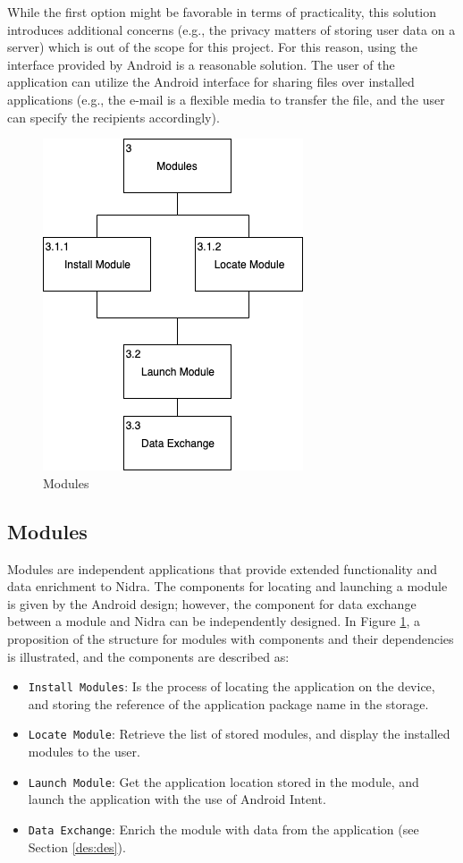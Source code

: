 While the first option might be favorable in terms of practicality, this solution introduces additional concerns (e.g., the privacy matters of storing user data on a server) which is out of the scope for this project. For this reason, using the interface provided by Android is a reasonable solution. The user of the application can utilize the Android interface for sharing files over installed applications (e.g., the e-mail is a flexible media to transfer the file, and the user can specify the recipients accordingly).  


\begin{figure}[!h]
    \centering
    \includegraphics[scale=0.6]{images/Modules.png}
    \caption{Modules}
    \label{fig:hta_modules}
\end{figure}

\subsection{Modules}\label{soc:modules}

Modules are independent applications that provide extended functionality and data enrichment to Nidra. The components for locating and launching a module is given by the Android design; however, the component for data exchange between a module and Nidra can be independently designed.  In Figure \ref{fig:hta_modules}, a proposition of the structure for modules with components and their dependencies is illustrated, and the components are described as:

\begin{itemize}
    \item[3.1.1] \verb|Install Modules|: Is the process of locating the application on the device, and storing the reference of the application package name in the storage.  
    \item[3.1.2] \verb|Locate Module|: Retrieve the list of stored modules, and display the installed modules to the user. 
    \item[3.2] \verb|Launch Module|: Get the application location stored in the module, and launch the application with the use of Android Intent. 
    \item[3.3] \verb|Data Exchange|: Enrich the module with data from the application (see Section \ref{des:des}).
\end{itemize}

